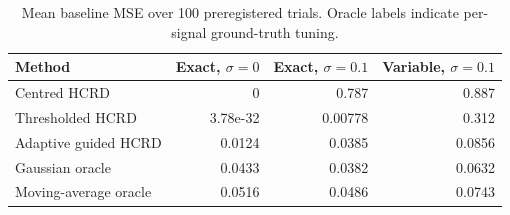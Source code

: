 \begin{table}[H]
\centering
\caption{Mean baseline MSE over 100 preregistered trials. Oracle labels indicate per-signal ground-truth tuning.}
\label{tab:synthetic}
\begin{tabular}{lrrr}
\toprule
Method & Exact, $\sigma=0$ & Exact, $\sigma=0.1$ & Variable, $\sigma=0.1$ \\
\midrule
Centred HCRD & 0 & 0.787 & 0.887 \\
Thresholded HCRD & 3.78e-32 & 0.00778 & 0.312 \\
Adaptive guided HCRD & 0.0124 & 0.0385 & 0.0856 \\
Gaussian oracle & 0.0433 & 0.0382 & 0.0632 \\
Moving-average oracle & 0.0516 & 0.0486 & 0.0743 \\
\bottomrule
\end{tabular}
\end{table}
